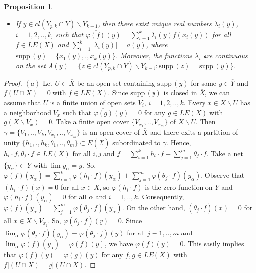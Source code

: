 \documentclass[12pt]{amsart}
\newtheorem{pro}[thm]{Proposition}
\def\supp{{\mathrm {supp}}\,}
\begin{document}
\begin{pro}
\begin{itemize}
are closed in $\overline Y$ such that $Y\subset\bigcup_{p,k\geq 1}\overline Y_{p,k}$, where
$$a(y)=\sup\{|\overline{\varphi(f)}(y)|:f\in LE(X){~}\hbox{and}{~}|\overline f(x)|<1{~} \forall x\in supp(y)\}.$$ 
\item[(e)] If $y\in cl(\overline Y_{p,k}\cap Y)\backslash\overline Y_{k-1}$,  then there exist unique real numbers $\lambda_i(y)$, $i=1,2,..,k$, such that $\overline{\varphi(f)}(y)=\sum_{i=1}^k\lambda_i(y)\overline f(x_i(y))$ for all $f\in LE(X)$ and $\sum_{i=1}^k|\lambda_i(y)|=a(y)$, where $\supp(y)=\{x_1(y),.,x_k(y)\}$. Moreover, the functions $\lambda_i$ are continuous on the set $A(y)=\{z\in cl(\overline Y_{p,k}\cap Y)\backslash\overline Y_{k-1}:\supp(z)=\supp(y)\}$.
\end{itemize}
\end{pro}
\begin{proof}
$(a)$ Let $U\subset\overline X$ be an open set containing $\supp(y)$ for some $y\in\overline Y$ and $f(U\cap X)=0$ with $f\in LE(X)$. Since $\supp(y)$ is closed in $\overline X$, we can assume that $U$ is a finite union of open sets $V_i$, $i=1,2,..,k$.
Every $x\in\overline X\backslash U$ has a neighborhood $V_x$ such that $\overline{\varphi(g)}(y)=0$ for any $g\in LE(X)$ with $g(X\backslash V_x)=0$. 
Take a finite open cover $\{V_{x_1},..,V_{x_m}\}$ of $\overline X\backslash U$. Then 
$\gamma=\{V_1,..,V_k,V_{x_1},..,V_{x_m}\}$ is an open cover of $\overline X$ and there exits a partition of unity $\{\overline h_1,.,\overline h_k,\overline\theta _1,..,\overline\theta_m\}\subset E(\overline X)$ subordinated to $\gamma$. Hence, $h_i\cdot f, \theta_j\cdot f\in LE(X)$ for all $i,j$ and
$f=\sum_{i=1}^kh_i\cdot f+\sum_{j=1}^m\theta_j\cdot f$. Take a net $\{y_\alpha\}\subset Y$ with $\lim y_\alpha=y$. 
So, $\varphi(f)(y_\alpha)=\sum_{i=1}^k\varphi(h_i\cdot f)(y_\alpha)+\sum_{j=1}^m\varphi(\theta_j\cdot f)(y_\alpha)$.
Observe that $(h_i\cdot f)(x)=0$ for all $x\in X$, so $\varphi(h_i\cdot f)$ is the zero function on $Y$ and $\varphi(h_i\cdot f)(y_\alpha)=0$ for all $\alpha$ and $i=1,..,k$. 
Consequently, $\varphi(f)(y_\alpha)=\sum_{j=1}^m\varphi(\theta_j\cdot f)(y_\alpha)$.
On the other hand, $(\theta_j\cdot f)(x)=0$ for all $x\in X\backslash V_{x_j}$. 
So, $\overline{\varphi(\theta_j\cdot f)}(y)=0$. Since $\lim_\alpha\varphi(\theta_j\cdot f)(y_\alpha)=\overline{\varphi(\theta_j\cdot f)}(y)$ for all $j=1,..,m$ and 
$\lim_\alpha\varphi(f)(y_\alpha)=\overline{\varphi(f)}(y)$, we have $\overline{\varphi(f)}(y)=0$. This easily implies that $\overline{\varphi(f)}(y)=\overline{\varphi(g)}(y)$ for any $f,g\in LE(X)$ with $f|(U\cap X)=g|(U\cap X)$.  


\end{proof}
\end{document}
